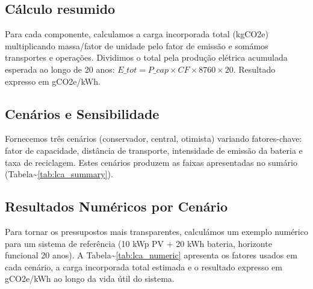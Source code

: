 \documentclass[12pt, a4paper]{article}
\begin{document}
\subsection{Cálculo resumido}
Para cada componente, calculamos a carga incorporada total (kgCO2e) multiplicando massa/fator
de unidade pelo fator de emissão e somámos transportes e operações. Dividimos o total pela
produção elétrica acumulada esperada ao longo de 20 anos: $E\_{tot}=P\_{cap}\times CF\times 8760\times 20$.
Resultado expresso em gCO2e/kWh.

\subsection{Cenários e Sensibilidade}
Fornecemos três cenários (conservador, central, otimista) variando fatores-chave: fator de
capacidade, distância de transporte, intensidade de emissão da bateria e taxa de reciclagem.
Estes cenários produzem as faixas apresentadas no sumário (Tabela\textasciitilde{}\ref{tab:lca_summary}).

\subsection{Resultados Numéricos por Cenário}
Para tornar os pressupostos mais transparentes, calculámos um exemplo numérico para um
sistema de referência (10 kWp PV + 20 kWh bateria, horizonte funcional 20 anos). A Tabela\textasciitilde{}\ref{tab:lca_numeric}
apresenta os fatores usados em cada cenário, a carga incorporada total estimada e o resultado
expresso em gCO2e/kWh ao longo da vida útil do sistema.

\begin{table}[H]
\centering
\caption{LCA Numérico: cenários conservador / central / otimista — sistema de referência (10 kWp + 20 kWh)}
\label{tab:lca_numeric}
\footnotesize
{}
\end{table}
\end{document}
